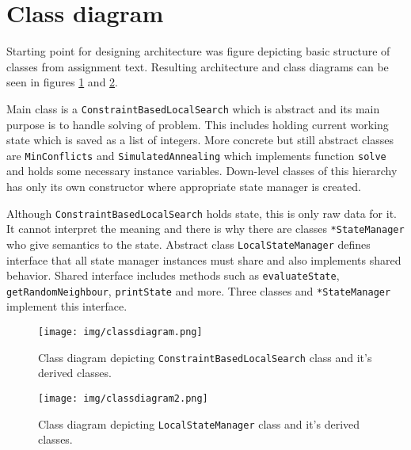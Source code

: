 \section{Class diagram}

Starting point for designing architecture was figure depicting basic structure of classes from assignment text. 
Resulting architecture and class diagrams can be seen in figures \ref{fig:class_diagram1} and \ref{fig:class_diagram2}.

Main class is a \texttt{ConstraintBasedLocalSearch} which is abstract and its main purpose is to handle solving of problem. 
This includes holding current working state which is saved as a list of integers.
More concrete but still abstract classes are \texttt{MinConflicts} and \texttt{SimulatedAnnealing} which implements function \texttt{solve} and holds some necessary instance variables. 
Down-level classes of this hierarchy has only its own constructor where appropriate state manager is created.

Although \texttt{ConstraintBasedLocalSearch} holds state, this is only raw data for it.
It cannot interpret the meaning and there is why there are classes \texttt{*StateManager} who give semantics to the state.
Abstract class  \texttt{LocalStateManager} defines interface that all state manager instances must share and also implements shared behavior. 
Shared interface includes methods such as \texttt{evaluateState}, \texttt{getRandomNeighbour}, \texttt{printState} and more.  
Three classes and \texttt{*StateManager} implement this interface.


\begin{figure}[h!]
	\centering
		\texttt{[image: img/classdiagram.png]}
	\caption{Class diagram depicting \texttt{ConstraintBasedLocalSearch} class and it's derived classes.}
	\label{fig:class_diagram1}
\end{figure}

\begin{figure}[h!]
	\centering
		\texttt{[image: img/classdiagram2.png]}
	\caption{Class diagram depicting \texttt{LocalStateManager} class and it's derived classes.}
	\label{fig:class_diagram2}
\end{figure}